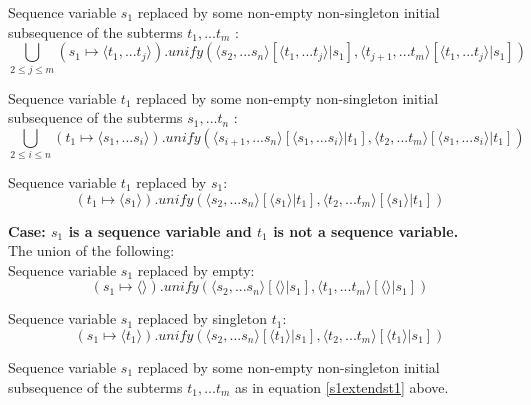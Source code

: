 \documentclass[10pt,a4paper,fleqn]{article}
\begin{document}
\noindent
Sequence variable $s_1$ replaced by some
non-empty non-singleton initial subsequence of the subterms $t_1,...t_m$ :
\begin{equation}
\label{s1extendst1}
 \bigcup_{2 \leq j \leq m}{(s_1 \mapsto \langle t_1,...t_j \rangle)
      .unify(\langle s_2,...s_n \rangle[\langle t_1,...t_j \rangle|s_1],
             \langle t_{j+1},...t_m \rangle[\langle t_1,...t_j \rangle|s_1]
						) }
\end{equation}

\noindent
Sequence variable $t_1$ replaced by some
non-empty non-singleton initial subsequence of the subterms $s_1,...t_n$ :
\begin{equation}
\label{t1extendss1}
 \bigcup_{2 \leq i \leq n}{(t_1 \mapsto \langle s_1,...s_i \rangle)
      .unify(\langle s_{i+1},...s_n \rangle[\langle s_1,...s_i \rangle|t_1],
             \langle t_2,...t_m \rangle[\langle s_1,...s_i \rangle|t_1]
						) }
\end{equation}

\noindent
Sequence variable $t_1$ replaced by $s_1$:
\begin{equation}
\label{t1mapstos1}
 (t_1 \mapsto \langle s_1 \rangle)
      .unify(\langle s_2,...s_n \rangle[\langle s_1 \rangle|t_1],
             \langle t_2,...t_m \rangle[\langle s_1 \rangle|t_1]
						)
\end{equation}


\noindent
\textbf{Case: $s_1$ is a sequence variable and $t_1$ is not a sequence variable.} \\

\noindent
The union of the following: \\


\noindent
Sequence variable $s_1$ replaced by empty:
\begin{equation}
 \label{s1empty}
 (s_1 \mapsto \langle \rangle)
      .unify(\langle s_2,...s_n \rangle[\langle \rangle|s_1],
             \langle t_1,...t_m \rangle[\langle \rangle|s_1]
						) 
\end{equation}

\noindent
Sequence variable $s_1$ replaced by singleton $t_1$: 
\begin{equation}
 \label{s1mapstot1}
 (s_1 \mapsto \langle t_1 \rangle)
      .unify(\langle s_2,...s_n \rangle[\langle t_1 \rangle|s_1],
             \langle t_2,...t_m \rangle[\langle t_1 \rangle|s_1]
						) 
\end{equation}	

\noindent
Sequence variable $s_1$ replaced by some
non-empty non-singleton initial subsequence of the subterms $t_1,...t_m$ 
as in equation \ref{s1extendst1} above. \\
\end{document}
